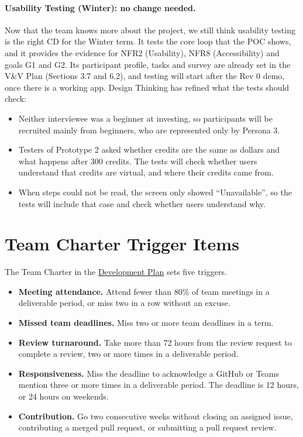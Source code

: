 \documentclass{article}
\begin{document}
\paragraph{Usability Testing (Winter): no change needed.} Now that the team
knows more about the project, we still think usability testing is the right
CD for the Winter term. It tests the core loop that the POC shows, and it
provides the evidence for NFR2 (Usability), NFR8 (Accessibility) and goals G1
and G2. Its participant profile, tasks and survey are already set in the V\&V
Plan (Sections 3.7 and 6.2), and testing will start after the Rev 0 demo, once
there is a working app. Design Thinking has refined what the tests should
check:

\begin{itemize}
\item Neither interviewee was a beginner at investing, so participants will be
  recruited mainly from beginners, who are represented only by Persona 3.
\item Testers of Prototype 2 asked whether credits are the same as dollars and
  what happens after 300 credits. The tests will check whether users
  understand that credits are virtual, and where their credits came from.
\item When steps could not be read, the screen only showed ``Unavailable'', so
  the tests will include that case and check whether users understand why.
\end{itemize}

\section{Team Charter Trigger Items}

The Team Charter in the
\href{https://github.com/davislenover/BurnNEarn/blob/main/docs/DevelopmentPlan/DevelopmentPlan.tex}{Development Plan}
sets five triggers.

\begin{itemize}
  \item \textbf{Meeting attendance.} Attend fewer than 80\% of team meetings
    in a deliverable period, or miss two in a row without an excuse.
  \item \textbf{Missed team deadlines.} Miss two or more team deadlines in a term.
  \item \textbf{Review turnaround.} Take more than 72 hours from the review
    request to complete a review, two or more times in a deliverable period.
  \item \textbf{Responsiveness.} Miss the deadline to acknowledge a GitHub or
    Teams mention three or more times in a deliverable period. The deadline
    is 12 hours, or 24 hours on weekends.
  \item \textbf{Contribution.} Go two consecutive weeks without closing an
    assigned issue, contributing a merged pull request, or submitting a
    pull request review.
\end{itemize}
\end{document}

